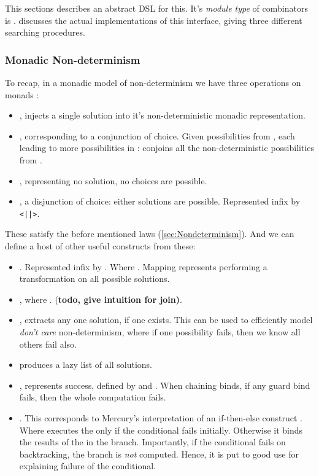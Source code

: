 This sections describes an abstract DSL for this. It's \textit{module type} of combinators is .  discusses the actual implementations of this interface, giving three different searching procedures.

\subsubsection{Monadic Non-determinism}
To recap, in a monadic model of non-determinism we have three operations on monads :
\begin{itemize} 
\item {}, injects a single solution into it's non-deterministic monadic representation.
\item {}, corresponding to a conjunction of choice. Given possibilities from , each leading to more possibilities in :  conjoins all the non-deterministic possibilities from .
\item {}, representing no solution, no choices are possible.
\item {}, a disjunction of choice: either solutions are possible. Represented infix by \texttt{<||>}.
\end{itemize}
These satisfy the before mentioned laws (\cref{sec:Nondeterminism}). And we can define a host of other useful constructs from these:
\begin{itemize}
\item {}. Represented infix by \code{>>|}. Where . Mapping represents performing a transformation on all possible solutions.
\item {}, where . (\textbf{todo, give intuition for join)}.
\item {}, extracts any one solution, if one exists. This can be used to efficiently model \textit{don't care} non-determinism, where if one possibility fails, then we know all others fail also.
\item {} produces a lazy list of all solutions.
\item {}, represents success, defined by  and . When chaining binds, if any guard bind fails, then the whole computation fails.
\item {}. This corresponds to Mercury's interpretation of an if-then-else construct \cite{Mercury}. Where  executes the  only if the conditional  fails initially. Otherwise it binds the results of the in the  branch. Importantly, if the conditional fails on backtracking, the  branch is \textit{not} computed. Hence, it is put to good use for explaining failure of the conditional.
\end{itemize}

